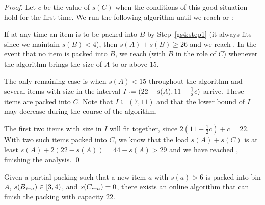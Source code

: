 \begin{proof}
Let $c$ be the value of $s(C)$ when the conditions of this good situation
hold for the first time.
We run the following algorithm until we reach  or :

\smallskip
{}
\medskip

If at any time an item is to be packed into $B$ by Step~\ref{gs4:step1} (it always fits since we maintain $s(B) < 4$),
then $s(A)+s(B)\ge 26$ and we reach . In the event that no item
is packed into $B$, we reach  (with $B$ in the role of $C$) whenever the algorithm brings the size
of $A$ to or above 15.

The only remaining case is when $s(A)<15$ throughout the algorithm and
several items with size in the interval $I \defeq
(22-s(A),11-\frac{1}{2}c)$ arrive. These items are packed into $C$.
Note that $I \subseteq (7,11)$ and that the lower bound of $I$ may decrease
during the course of the algorithm.

The first two items with size in $I$ will fit together,
since $2(11-\frac{1}{2}c) + c = 22$. With two such items packed into $C$, we know that the load $s(A) + s(C)$ is at least $s(A) + 2(22-s(A)) = 44 - s(A) > 29$ and we have reached , finishing the analysis. \qed

\end{proof}

\begin{goodsit}\label{lem:gs5}
Given a partial packing such that a new item $a$ with $s(a)>6$ is packed
into bin $A$, $s(B_{\leftarrow a}) \in [3,4)$, and $s(C_{\leftarrow a})=0$,
there exists an online algorithm that can finish the packing with capacity $22$.
\end{goodsit}

